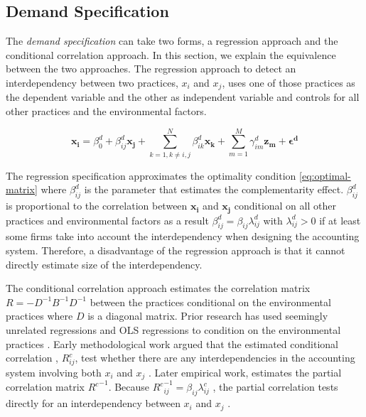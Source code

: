 \documentclass[12pt]{article}
\begin{document}
\subsection{Demand Specification}\label{demand-specification}

The \emph{demand specification} can take two forms, a regression approach and the conditional correlation approach. In this section, we explain the equivalence between the two approaches. The regression  approach to detect an interdependency between two practices, $x_i$ and $x_j$, uses one of those practices as the dependent variable and the other as independent variable and controls for all other practices and the environmental factors.

\begin{equation} \label{eq:demand-specification}
\mathbf{x_i} = \beta_0^d + \beta_{ij}^d \mathbf{x_j} 
		+ \sum_{k = 1, k \neq i,j}^N \beta_{ik}^d \mathbf{x_k} 
        + \sum_{m = 1}^M \gamma_{im}^d \mathbf{z_m}
        + \mathbf{\epsilon^d}
\end{equation}

The regression specification approximates the optimality condition  \eqref{eq:optimal-matrix} where \(\beta^d_{ij}\) is the parameter that estimates the complementarity effect. $\beta_{ij}^d$ is proportional to the  correlation between $\mathbf{x_i}$ and $\mathbf{x_j}$ conditional on all other practices and environmental factors as a result  $\beta^d_{ij} = \beta_{ij} \lambda^d_{ij}$ with $\lambda^d_{ij} > 0$ if at least some firms take into account the interdependency when designing the accounting system. Therefore, a disadvantage of the regression approach is that it cannot directly estimate size of the interdependency.

The conditional correlation approach estimates the correlation matrix $R = -D^{-1}B^{-1}D^{-1}$ between the practices  conditional on the environmental practices where $D$ is a diagonal matrix. Prior research has used seemingly unrelated regressions and OLS regressions to condition on the environmental practices \citep{Indjejikian2012, Matejka2017BalancingEvidence}. Early methodological work argued that the estimated conditional correlation , $R^c_{ij}$, test whether there are any interdependencies in the accounting system involving both $x_i$ and $x_j$ \citep{Arora1996}.  Later empirical work, estimates the partial correlation matrix ${R^c}^{-1}$. Because ${R^c}^{-1}_{ij} = \beta_{ij} \lambda^c_{ij}$ , the partial correlation tests directly for an interdependency between $x_i$ and $x_j$ \citep{Indjejikian2012}. 
\end{document}
